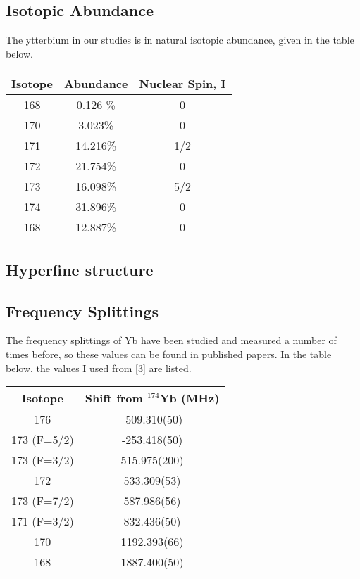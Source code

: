 \documentclass[12pt, a4paper]{article}
\begin{document}
\subsection{Isotopic Abundance}
The ytterbium in our studies is in natural isotopic abundance, given in the table below.
\begin{center}
\begin{tabular}{||c|c|c||}
\hline
Isotope & Abundance & Nuclear Spin, I\\
\hline \hline
168 & 0.126 \% & 0\\
\hline
170 & 3.023\% & 0 \\
\hline
171 & 14.216\% & 1/2 \\
\hline
172 & 21.754\% & 0 \\
\hline
173 & 16.098\% & 5/2 \\
\hline
174 & 31.896\% & 0 \\
\hline
168 & 12.887\% & 0 \\
\hline
\end{tabular}
\end{center}
\subsection{Hyperfine structure}
\subsection{Frequency Splittings}
The frequency splittings of Yb have been studied and measured a number of times before, so these values can be found in published papers. In the table below, the values I used from [3] are listed.
\begin{center}
\begin{tabular}{||c|c||}
\hline
Isotope & Shift from $^{174}$Yb (MHz)\\
\hline\hline
176 & -509.310(50) \\
\hline
173 (F=5/2) & -253.418(50) \\
\hline
173 (F=3/2) & 515.975(200) \\
\hline
172 & 533.309(53) \\
\hline
173 (F=7/2) & 587.986(56) \\
\hline
171 (F=3/2) & 832.436(50) \\
\hline
170 & 1192.393(66) \\
\hline
168 & 1887.400(50) \\
\hline
\end{tabular}
\end{center}
\end{document}
